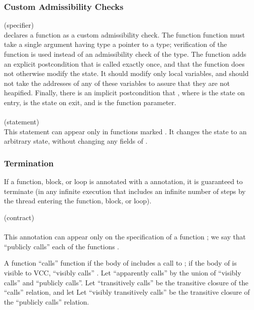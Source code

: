 \documentclass[preprint,nocopyrightspace]{sigplanconf}
\begin{document}
{{{\begin{VCC}
\subsubsection{Custom Admissibility Checks}
 (specifier)\\
 declares a function as a custom admissibility check. The function
function must take a single argument having type a pointer to a  type;
verification of the function is used instead of an admissibility check
of the  type. The function adds an explicit postcondition
that   is called exactly once, and that the
function does not otherwise modify the state. It should modify only
local variables, and should not take the addresses of any of these
variables to assure that they are not heapified. Finally, there is an
implicit postcondition that , where  is
the state on entry,  is the state on exit, and  is the
function parameter.
\\\\
 (statement)\\
This statement can appear only in functions
marked . It changes the state to an arbitrary
\vcc{\legal} state, without changing any fields of .

\subsubsection{Termination}
If a function, block, or loop is annotated with a 
annotation, it is guaranteed to terminate (in any infinite execution
that includes an infinite number of steps by the thread entering the
function, block, or loop).

 (contract)\\
\\ 
This annotation can appear only on the specification of a
function ; we say that  ``publicly calls'' each of the
functions . 

A function  ``calls'' function  if the body of 
includes a call to ; if the body of  is visible to VCC,
 ``visibly calls'' . Let ``apparently calls'' by the
union of ``visibly calls'' and ``publicly calls''. 
Let ``transitively calls'' be the
transitive closure of the ``calls'' relation, and let Let ``visibly
transitively calls'' be the transitive closure of the ``publicly
calls'' relation. 


\end{VCC}}}}
\end{document}
